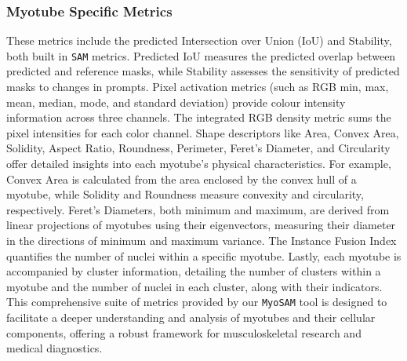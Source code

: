 \subsubsection{Myotube Specific Metrics}
These metrics include the predicted Intersection over Union (IoU) and Stability, both built in \texttt{SAM} metrics. Predicted IoU measures the predicted overlap between predicted and reference masks, while Stability assesses the sensitivity of predicted masks to changes in prompts. Pixel activation metrics (such as RGB min, max, mean, median, mode, and standard deviation) provide colour intensity information across three channels. The integrated RGB density metric sums the pixel intensities for each color channel. Shape descriptors like Area, Convex Area, Solidity, Aspect Ratio, Roundness, Perimeter, Feret’s Diameter, and Circularity offer detailed insights into each myotube's physical characteristics. For example, Convex Area is calculated from the area enclosed by the convex hull of a myotube, while Solidity and Roundness measure convexity and circularity, respectively. Feret's Diameters, both minimum and maximum, are derived from linear projections of myotubes using their eigenvectors, measuring their diameter in the directions of minimum and maximum variance. The Instance Fusion Index quantifies the number of nuclei within a specific myotube. Lastly, each myotube is accompanied by cluster information, detailing the number of clusters within a myotube and the number of nuclei in each cluster, along with their indicators.
This comprehensive suite of metrics provided by our \texttt{MyoSAM} tool is designed to facilitate a deeper understanding and analysis of myotubes and their cellular components, offering a robust framework for musculoskeletal research and medical diagnostics.


